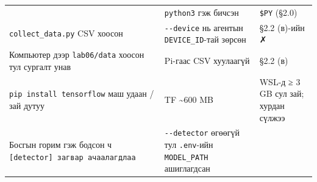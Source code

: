 \begin{longtable}[]{@{}lll@{}}
\begin{minipage}[t]{0.30\columnwidth}
\end{minipage} & \begin{minipage}[t]{0.30\columnwidth}\raggedright
\texttt{python3} гэж бичсэн\strut
\end{minipage} & \begin{minipage}[t]{0.30\columnwidth}\raggedright
\texttt{\$PY} (§2.0)\strut
\end{minipage}\tabularnewline
\begin{minipage}[t]{0.30\columnwidth}\raggedright
\texttt{collect\_data.py} CSV хоосон\strut
\end{minipage} & \begin{minipage}[t]{0.30\columnwidth}\raggedright
\texttt{-\/-device} нь агентын \texttt{DEVICE\_ID}-тай зөрсөн\strut
\end{minipage} & \begin{minipage}[t]{0.30\columnwidth}\raggedright
§2.2 (в)-ийн ✗\strut
\end{minipage}\tabularnewline
\begin{minipage}[t]{0.30\columnwidth}\raggedright
Компьютер дээр \texttt{lab06/data} хоосон тул сургалт унав\strut
\end{minipage} & \begin{minipage}[t]{0.30\columnwidth}\raggedright
Pi-гаас CSV хуулаагүй\strut
\end{minipage} & \begin{minipage}[t]{0.30\columnwidth}\raggedright
§2.2 (в)\strut
\end{minipage}\tabularnewline
\begin{minipage}[t]{0.30\columnwidth}\raggedright
\texttt{pip\ install\ tensorflow} маш удаан / зай дутуу\strut
\end{minipage} & \begin{minipage}[t]{0.30\columnwidth}\raggedright
TF \textasciitilde600 MB\strut
\end{minipage} & \begin{minipage}[t]{0.30\columnwidth}\raggedright
WSL-д ≥ 3 GB сул зай; хурдан сүлжээ\strut
\end{minipage}\tabularnewline
\begin{minipage}[t]{0.30\columnwidth}\raggedright
Босгын горим гэж бодсон ч \texttt{{[}detector{]}\ загвар\ ачаалагдлаа}\strut
\end{minipage} & \begin{minipage}[t]{0.30\columnwidth}\raggedright
\texttt{-\/-detector} өгөөгүй тул \texttt{.env}-ийн \texttt{MODEL\_PATH} ашиглагдсан\strut
\end{minipage} & \begin{minipage}[t]{0.30\columnwidth}\raggedright

\end{minipage}
\end{longtable}
